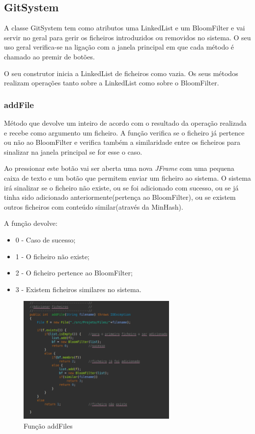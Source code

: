 \documentclass{report}
\begin{document}
\subsection{GitSystem}
A classe GitSystem tem como atributos uma LinkedList e um BloomFilter e vai servir no geral para gerir os ficheiros introduzidos ou removidos no sistema. O seu uso geral verifica-se na ligação com a janela principal em que cada método é chamado ao premir de botões.

O seu construtor inicia a LinkedList de ficheiros como vazia. Os seus métodos realizam operações tanto sobre a LinkedList como sobre o BloomFilter.
\subsubsection{addFile}
Método que devolve um inteiro de acordo com o resultado da operação realizada e recebe como argumento um ficheiro. A função verifica se o ficheiro já pertence ou não ao BloomFilter e verifica também a similaridade entre os ficheiros para sinalizar na janela principal se for esse o caso. 

Ao pressionar este botão vai ser aberta uma nova {\itshape JFrame} com uma pequena caixa de texto e um botão que permitem enviar um ficheiro ao sistema. O sistema irá sinalizar se o ficheiro não existe, ou se foi adicionado com sucesso, ou se já tinha sido adicionado anteriormente(pertença ao BloomFilter), ou se existem outros ficheiros com conteúdo similar(através da MinHash).

A função devolve:
\begin{itemize}
   \item 0 - Caso de sucesso;
   \item 1 - O ficheiro não existe;
   \item 2 - O ficheiro pertence ao BloomFilter;
   \item 3 - Existem ficheiros similares no sistema.
\end{itemize}

\begin{figure}[h]
\center %
\includegraphics[height=180pt]{add.png}
\caption{Função addFiles}
\label{fig:Fig22}
\end{figure}
 
\end{document}
